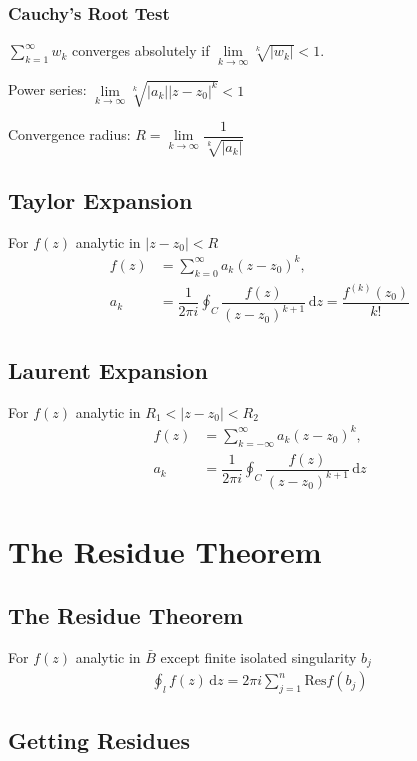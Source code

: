 \documentclass[10pt, a4paper]{article}
\def\d{\,\mathrm{d}}
\def\Res{\mathrm{Res}}
\begin{document}
\begin{multicols}{2}
			\subsubsection{Cauchy's Root Test}
			$\displaystyle \sum_{k = 1}^{\infty}w_k$ converges absolutely if $\lim\limits_{k\rightarrow\infty}\sqrt[k]{|w_k|} < 1$.
			
			Power series: $\lim\limits_{k\rightarrow\infty}\sqrt[k]{|a_k||z-z_0|^k} < 1$
			
			Convergence radius: $R = \lim\limits_{k\rightarrow\infty}\dfrac{1}{\sqrt[k]{|a_k|}}$
			
		\subsection{Taylor Expansion}
		
		For $f(z)$ analytic in $|z-z_0| < R$
		\begin{align}
			f(z) &= \sum_{k=0}^{\infty}a_k(z - z_0)^k,\\
			a_k &= \dfrac{1}{2\pi i}\oint_C \dfrac{f(z)}{(z-z_0)^{k+1}}\d z = \dfrac{f^{(k)}(z_0)}{k!}
		\end{align}
		
		\subsection{Laurent Expansion}
		
		For $f(z)$ analytic in $R_1 < |z-z_0| < R_2$
		\begin{align}
			f(z) &= \sum_{k=-\infty}^{\infty}a_k(z-z_0)^k,\\
			a_k &= \dfrac{1}{2\pi i}\oint_C \dfrac{f(z)}{(z-z_0)^{k+1}}\d z 
		\end{align}
	
\section{The Residue Theorem}

	\subsection{The Residue Theorem}
		
		For $f(z)$ analytic in $\bar{B}$ except finite isolated singularity $b_j$
		\begin{align}
			\oint_l f(z)\d z = 2\pi i \sum_{j=1}^{n}\Res f(b_j)
		\end{align}
	
	\subsection{Getting Residues}
	

\end{multicols}
\end{document}
